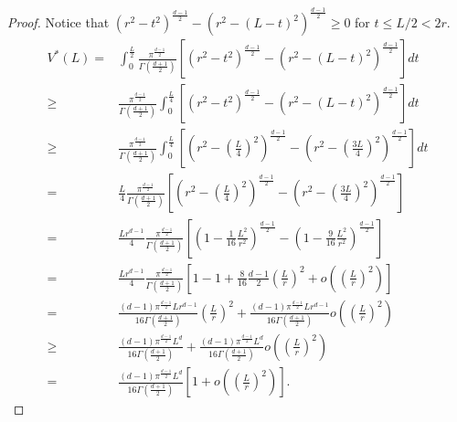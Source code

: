 \documentclass[preprint,12pt]{elsarticle}
\begin{document}
\begin{proof} Notice that $ \left( r^2-t^2\right)^{\frac{d-1}{2}}-\left(r^2-(L  -t )^2\right)^{\frac{d-1}{2}}\geq  0$ for   $t\leq L/2<2r$.
\begin{equation*}
\begin{aligned}
V^{*}(L)=&\int_0^{\frac{L  }{2}} \frac{\pi^{\frac{d-1}{2}}}{\Gamma\left(\frac{d+1}{2}\right)} \left[ \left( r^2-t^2\right)^{\frac{d-1}{2}}-\left(r^2-(L  -t )^2\right)^{\frac{d-1}{2}} \right]dt\\
\geq &\frac{\pi^{\frac{d-1}{2}}}{\Gamma\left(\frac{d+1}{2}\right)}\int_0^{\frac{L  }{4}} \left[ \left( r^2-t^2\right)^{\frac{d-1}{2}}-\left(r^2-(L  -t )^2\right)^{\frac{d-1}{2}} \right]dt\\
\geq &\frac{\pi^{\frac{d-1}{2}}}{\Gamma\left(\frac{d+1}{2}\right)}
\int_0^{ \frac{L  }{4}} \left[ \left( r^2- \left(\frac{L}{4}\right)^2 \right)^{\frac{d-1}{2}}-\left(r^2-\left(\frac{3L}{4}\right)^2\right)^{\frac{d-1}{2}} \right]dt\\
= &\frac{L}{4}\frac{\pi^{\frac{d-1}{2}}}{\Gamma\left(\frac{d+1}{2}\right)}
  \left[ \left( r^2-\left(\frac{L}{4}\right)^2\right)^{\frac{d-1}{2}}-\left(r^2-\left(\frac{3L}{4}\right)^2\right)^{\frac{d-1}{2}} \right]\\
=& \frac{Lr^{d-1}}{4}\frac{\pi^{\frac{d-1}{2}}}{\Gamma\left(\frac{d+1}{2}\right)}
  \left[ \left( 1-\frac{1}{16}\frac{L^2}{r^2}\right)^{\frac{d-1}{2}}-\left(1-\frac{9}{16}\frac{L^2}{r^2} \right)^{\frac{d-1}{2}} \right]\\
=& \frac{Lr^{d-1}}{4}\frac{\pi^{\frac{d-1}{2}}}{\Gamma\left(\frac{d+1}{2}\right)}
  \left[1-1+  \frac{8}{16} \frac{d-1}{2}\left(\frac{L}{r}\right)^2 +o\left(\left(\frac{L}{r}\right)^2\right)  \right]\\
=& \frac{(d-1)\pi^{\frac{d-1}{2}} Lr^{d-1} }{16\Gamma\left(\frac{d+1}{2}\right)}    \left(\frac{L}{r}\right)^2 + \frac{(d-1)\pi^{\frac{d-1}{2}} Lr^{d-1} }{16\Gamma\left(\frac{d+1}{2}\right)} o\left(\left(\frac{L}{r}\right)^2\right)   \\
\geq & \frac{(d-1)\pi^{\frac{d-1}{2}} L^d  }{16\Gamma\left(\frac{d+1}{2}\right)}  +\frac{(d-1)\pi^{\frac{d-1}{2}} L^d}{16\Gamma\left(\frac{d+1}{2}\right)} o\left(\left(\frac{L}{r}\right)^2\right) \\
= &\frac{(d-1)\pi^{\frac{d-1}{2}} L^d}{16\Gamma\left(\frac{d+1}{2}\right)}\left[ 1+ o\left(\left(\frac{L}{r}\right)^2\right) \right].
\end{aligned}
\end{equation*}
\end{proof}
\end{document}
